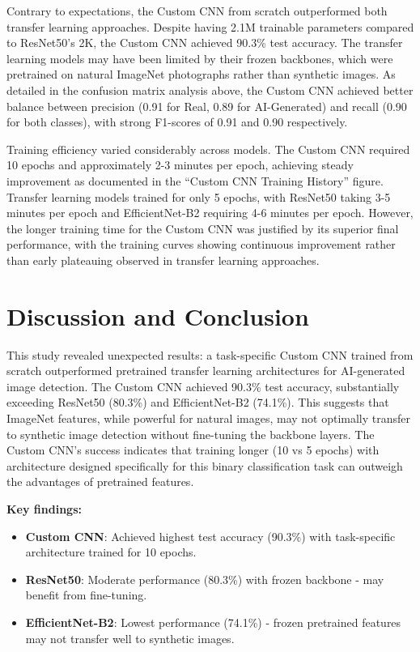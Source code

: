 \documentclass[man,12pt,letterpaper,donotrepeattitle,floatsintext]{apa7}
\begin{document}
Contrary to expectations, the Custom CNN from scratch outperformed both transfer learning 
approaches. Despite having 2.1M trainable parameters compared to ResNet50's 2K, the Custom CNN 
achieved 90.3\% test accuracy. The transfer learning models may have been limited by their 
frozen backbones, which were pretrained on natural ImageNet photographs rather than synthetic 
images. As detailed in the confusion matrix analysis above, the Custom CNN achieved better 
balance between precision (0.91 for Real, 0.89 for AI-Generated) and recall (0.90 for both 
classes), with strong F1-scores of 0.91 and 0.90 respectively.

Training efficiency varied considerably across models. The Custom CNN required 10 epochs 
and approximately 2-3 minutes per epoch, achieving steady improvement as documented in the 
``Custom CNN Training History'' figure. Transfer learning models trained for only 5 epochs, with 
ResNet50 taking 3-5 minutes per epoch and EfficientNet-B2 requiring 4-6 minutes per epoch. 
However, the longer training time for the Custom CNN was justified by its superior final 
performance, with the training curves showing continuous improvement rather than early 
plateauing observed in transfer learning approaches.

\section{Discussion and Conclusion}
\label{conclusion}

This study revealed unexpected results: a task-specific Custom CNN trained from scratch 
outperformed pretrained transfer learning architectures for AI-generated image detection. 
The Custom CNN achieved 90.3\% test accuracy, substantially exceeding ResNet50 (80.3\%) and 
EfficientNet-B2 (74.1\%). This suggests that ImageNet features, while powerful for natural 
images, may not optimally transfer to synthetic image detection without fine-tuning the 
backbone layers. The Custom CNN's success indicates that training longer (10 vs 5 epochs) 
with architecture designed specifically for this binary classification task can outweigh 
the advantages of pretrained features.

\textbf{Key findings:}
\begin{itemize}
    \item \textbf{Custom CNN}: Achieved highest test accuracy (90.3\%) with task-specific architecture trained for 10 epochs.
    \item \textbf{ResNet50}: Moderate performance (80.3\%) with frozen backbone - may benefit from fine-tuning.
    \item \textbf{EfficientNet-B2}: Lowest performance (74.1\%) - frozen pretrained features may not transfer well to synthetic images.
\end{itemize}
\end{document}
